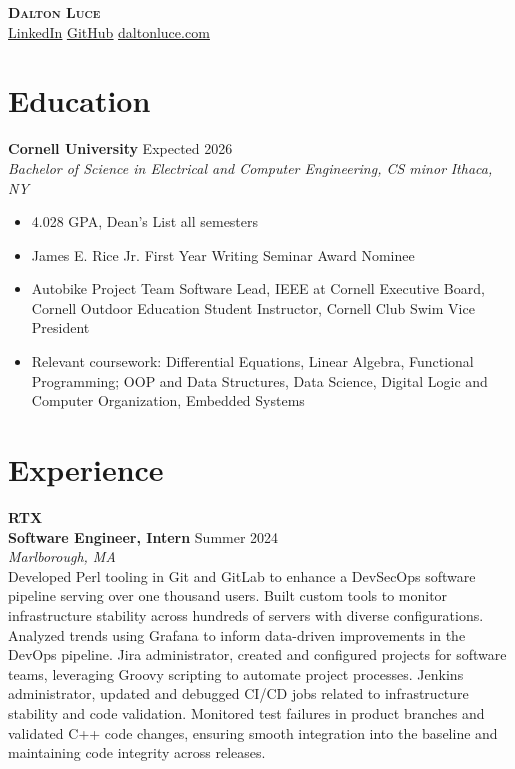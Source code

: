 \documentclass[letterpaper,8pt]{article}
\newcommand{\company}[1]{
    \large \textbf{#1} \\
}
\newcommand{\position}[3]{
    \hspace{0.5cm} \normalsize \textbf{#1} 
    \hfill {\small #2}
    \\
    \hfill \small \textit{#3}
    \\
}
\newcommand{\resumeEntry}[4]{
    \vspace{4pt}
    \large \textbf{#1}
    \normalsize \hfill #2
    \\
    \textit{#3} \hfill \textit{#4}
    \vspace{1pt}
}
\newcommand{\itemsBegin}{
    \begin{itemize}[leftmargin=0.2in, labelsep=0.05in, itemsep=0pt, parsep=1pt, topsep=0pt, partopsep=0pt]
}
\newcommand{\itemsEnd}{\end{itemize}}
\begin{document}
\textbf{\huge \scshape Dalton Luce} \\
\vspace{2pt}
\small
\addressConditional
\phoneConditional
\emailConditional
\href{https://www.linkedin.com/in/dalton-luce/}{\underline{LinkedIn}}
\hspace{10pt}
\href{https://github.com/da-luce}{\underline{GitHub}}
\hspace{10pt}
\href{https://daltonluce.com/}{\underline{daltonluce.com}}
\vspace{-5pt}

\section{Education}

    \resumeEntry
        {Cornell University}
        {Expected 2026}
        {Bachelor of Science in Electrical and Computer Engineering, CS minor}
        {Ithaca, NY}

    \itemsBegin
        \item 4.028 GPA, Dean's List all semesters
        \item James E. Rice Jr. First Year Writing Seminar Award Nominee
        \item Autobike Project Team Software Lead, IEEE at Cornell Executive Board, Cornell Outdoor Education Student Instructor, Cornell Club Swim Vice President
        \item Relevant coursework: Differential Equations, Linear Algebra, Functional Programming; OOP and Data Structures, Data Science, Digital Logic and Computer Organization, Embedded Systems
    \itemsEnd

\section{Experience}

    \company{RTX}

    \position{Software Engineer, Intern}{Summer 2024}{Marlborough, MA}
    \begingroup
    \leftskip=0.5cm
    Developed Perl tooling in Git and GitLab to enhance a DevSecOps software pipeline serving over one thousand users. Built custom tools to monitor infrastructure stability across hundreds of servers with diverse configurations. Analyzed trends using Grafana to inform data-driven improvements in the DevOps pipeline. Jira administrator, created and configured projects for software teams, leveraging Groovy scripting to automate project processes. Jenkins administrator, updated and debugged CI/CD jobs related to infrastructure stability and code validation. Monitored test failures in product branches and validated C++ code changes, ensuring smooth integration into the baseline and maintaining code integrity across releases.
    \par
    \endgroup
\end{document}
